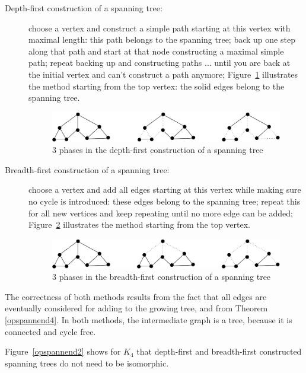 \begin{description}
\item[Depth-first construction of a spanning tree:] choose a vertex
and construct a simple path starting at this vertex with maximal
length: this path belongs to the spanning tree; back up one step along
that path and start at that node constructing a maximal simple path;
repeat backing up and constructing paths ... until you are back at the
initial vertex and can't construct a path anymore;
Figure~\ref{diepteeerst1} illustrates the method starting from the top
vertex: the solid edges belong to the spanning tree.
\begin{figure}[ht]
\begin{center}
\includegraphics[width=0.6\linewidth,keepaspectratio]{diepteeerst1}
\end{center}
\caption{3 phases in the depth-first construction of a spanning
tree \label{diepteeerst1}}
\end{figure}

\item[Breadth-first construction of a spanning tree:]
choose a vertex and add all edges starting at this vertex while making sure no
cycle is introduced: these edges belong to the spanning tree; repeat this
for all new vertices and keep repeating until no more edge can be
added; Figure~\ref{breedteeerst1} illustrates the method starting from
the top vertex.


\begin{figure}[ht]
\begin{center}
\includegraphics[width=0.6\linewidth,keepaspectratio]{breedteeerst1}
\end{center}
\caption{3 phases in the breadth-first construction of a spanning tree \label{breedteeerst1}}
\end{figure}
\end{description}

The correctness of both methods results from the fact that all edges
are eventually considered for adding to the growing tree, and from
Theorem \ref{opspannend4}. In both methods, the intermediate graph is
a tree, because it is connected and cycle free.

Figure~\ref{opspannend2} shows for $K_{4}$ that depth-first and
breadth-first constructed spanning trees do not need to be isomorphic.

